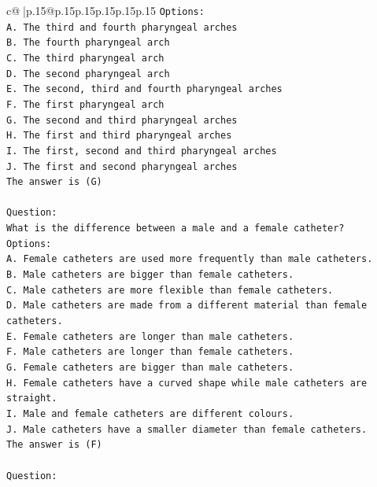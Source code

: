 \documentclass{article}
\begin{document}
{\begin{supertabular}{c@{$\;$}|p{.15\linewidth}@{}p{.15\linewidth}p{.15\linewidth}p{.15\linewidth}p{.15\linewidth}p{.15\linewidth}}
{{{\texttt{Options:} \\
\texttt{A. The third and fourth pharyngeal arches} \\
\texttt{B. The fourth pharyngeal arch} \\
\texttt{C. The third pharyngeal arch} \\
\texttt{D. The second pharyngeal arch} \\
\texttt{E. The second, third and fourth pharyngeal arches} \\
\texttt{F. The first pharyngeal arch} \\
\texttt{G. The second and third pharyngeal arches} \\
\texttt{H. The first and third pharyngeal arches} \\
\texttt{I. The first, second and third pharyngeal arches} \\
\texttt{J. The first and second pharyngeal arches} \\
\texttt{The answer is (G)} \\
\\ 
\texttt{Question:} \\
\texttt{What is the difference between a male and a female catheter?} \\
\texttt{Options:} \\
\texttt{A. Female catheters are used more frequently than male catheters.} \\
\texttt{B. Male catheters are bigger than female catheters.} \\
\texttt{C. Male catheters are more flexible than female catheters.} \\
\texttt{D. Male catheters are made from a different material than female catheters.} \\
\texttt{E. Female catheters are longer than male catheters.} \\
\texttt{F. Male catheters are longer than female catheters.} \\
\texttt{G. Female catheters are bigger than male catheters.} \\
\texttt{H. Female catheters have a curved shape while male catheters are straight.} \\
\texttt{I. Male and female catheters are different colours.} \\
\texttt{J. Male catheters have a smaller diameter than female catheters.} \\
\texttt{The answer is (F)} \\
\\ 
\texttt{Question:} \\
}}}
\end{supertabular}}
\end{document}
